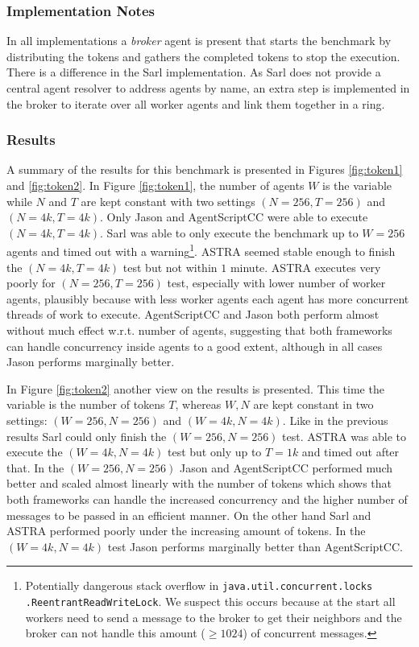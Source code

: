 \subsubsection{Implementation Notes} In all implementations a \textit{broker} agent is present that starts the benchmark by distributing the tokens and gathers the completed tokens to stop the execution. There is a difference in the Sarl implementation. As Sarl does not provide a central agent resolver to address agents by name, an extra step is implemented in the broker to iterate over all worker agents and link them together in a ring.

\subsubsection{Results} 
A summary of the results for this benchmark is presented in Figures \ref{fig:token1} and \ref{fig:token2}. In Figure \ref{fig:token1}, the number of agents $W$ is the variable while $N$ and $T$ are kept constant with two settings $(N=256,T=256)$ and $(N=4k,T=4k)$. Only Jason and AgentScriptCC were able to execute $(N=4k,T=4k)$. Sarl was able to only execute the benchmark up to $W=256$ agents and timed out with a warning\footnote{Potentially dangerous stack overflow in \texttt{java.util.concurrent.locks} \texttt{.ReentrantReadWriteLock}. We suspect this occurs because at the start all workers need to send a message to the broker to get their neighbors and the broker can not handle this amount ($\ge1024$) of concurrent messages.}. ASTRA seemed stable enough to finish the $(N=4k,T=4k)$ test but not within $1$ minute. ASTRA executes very poorly for $(N=256,T=256)$ test, especially with lower number of worker agents, plausibly because with less worker agents each agent has more concurrent threads of work to execute. AgentScriptCC and Jason both perform almost without much effect w.r.t. number of agents, suggesting that both frameworks can handle concurrency inside agents to a good extent, although in all cases Jason performs marginally better.

In Figure \ref{fig:token2} another view on the results is presented. This time the variable is the number of tokens $T$, whereas $W,N$ are kept constant in two settings:  $(W=256,N=256)$ and $(W=4k,N=4k)$. Like in the previous results Sarl could only finish the $(W=256,N=256)$ test. ASTRA was able to execute the $(W=4k,N=4k)$ test but only up to $T=1k$ and timed out after that. In the $(W=256,N=256)$ Jason and AgentScriptCC performed much better and scaled almost linearly with the number of tokens which shows that both frameworks can handle the increased concurrency and the higher number of messages to be passed in an efficient manner. On the other hand Sarl and ASTRA performed poorly under the increasing amount of tokens. In the $(W=4k,N=4k)$ test Jason performs marginally better than AgentScriptCC.

